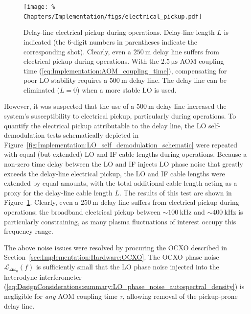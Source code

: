 \begin{figure}
  \centering
  \texttt{[image: \%
    Chapters/Implementation/figs/electrical\_pickup.pdf]}
  \caption[Delay-line electrical pickup during \diiid\space operations]{%
    Delay-line electrical pickup during \diiid\space operations.
    Delay-line length $L$ is indicated
    (the $6$-digit numbers in parentheses indicate
    the corresponding \diiid\space shot).
    Clearly, even a $\SI{250}{\meter}$ delay line
    suffers from electrical pickup during \diiid\space operations.
    With the $\SI{2.5}{\micro\second}$ AOM coupling time
    (\ref{eq:Implementation:AOM_coupling_time}),
    compensating for poor LO stability
    requires a $\SI{500}{\meter}$ delay line.
    The delay line can be eliminated ($L = 0$)
    when a more stable LO is used.
  }
\label{fig:Implementation:electrical_pickup}
\end{figure}

However, it was suspected that the use of a $\SI{500}{\meter}$ delay line
increased the system's susceptibility to electrical pickup,
particularly during \diiid\space operations.
To quantify the electrical pickup attributable to the delay line,
the LO self-demodulation tests schematically depicted in
Figure~\ref{fig:Implementation:LO_self_demodulation_schematic}
were repeated with equal (but extended) LO and IF cable lengths
during \diiid\space operations.
Because a non-zero time delay between the LO and IF
injects LO phase noise that greatly exceeds
the delay-line electrical pickup,
the LO and IF cable lengths were extended by equal amounts,
with the total additional cable length
acting as a proxy for the delay-line cable length $L$.
The results of this test are shown in
Figure~\ref{fig:Implementation:electrical_pickup}.
Clearly, even a $\SI{250}{\meter}$ delay line
suffers from electrical pickup during \diiid\space operations;
the broadband electrical pickup between
$\sim \SI{100}{\kilo\hertz}$ and $\sim \SI{400}{\kilo\hertz}$
is particularly constraining,
as many plasma fluctuations of interest occupy this frequency range.

The above noise issues were resolved by procuring the OCXO described in
Section~\ref{sec:Implementation:Hardware:OCXO}.
The OCXO phase noise $\mathcal{L}_{\Delta \omega_0}(f)$
is sufficiently small that
the LO phase noise injected into the heterodyne interferometer
(\ref{eq:DesignConsiderations:summary:LO_phase_noise_autospectral_density})
is negligible for \emph{any} AOM coupling time $\tau$,
allowing removal of the pickup-prone delay line.


